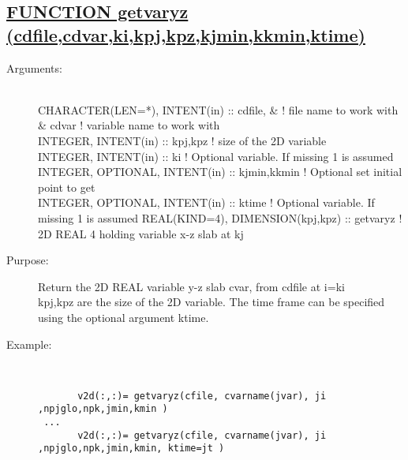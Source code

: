 \documentclass[a4paper,11pt]{article}
\begin{document}
\subsection*{\underline{FUNCTION getvaryz (cdfile,cdvar,ki,kpj,kpz,kjmin,kkmin,ktime)  }}
\begin{description}
\item[Arguments:]\ \\
    CHARACTER(LEN=*), INTENT(in) :: cdfile,     \&   ! file name to work with  \\
         \&                          cdvar           ! variable name to work with  \\
    INTEGER, INTENT(in) :: kpj,kpz                  ! size of the 2D variable  \\
    INTEGER, INTENT(in) :: ki                       ! Optional variable. If missing 1 is assumed  \\
    INTEGER, OPTIONAL, INTENT(in) :: kjmin,kkmin    ! Optional  set initial point to get \\
    INTEGER, OPTIONAL, INTENT(in) :: ktime          ! Optional variable. If missing 1 is assumed
    REAL(KIND=4), DIMENSION(kpj,kpz) :: getvaryz    ! 2D REAL 4 holding variable x-z slab at kj  \\
\item[Purpose:]  Return the 2D REAL variable y-z slab cvar, from cdfile at i=ki \\
  kpj,kpz are the  size of the 2D variable. The time frame  can be specified using the optional argument ktime.
\item[Example:]\ \\
\begin{verbatim}
       v2d(:,:)= getvaryz(cfile, cvarname(jvar), ji ,npjglo,npk,jmin,kmin )
 ...
       v2d(:,:)= getvaryz(cfile, cvarname(jvar), ji ,npjglo,npk,jmin,kmin, ktime=jt )
\end{verbatim}
\end{description}
\newpage
\end{document}
